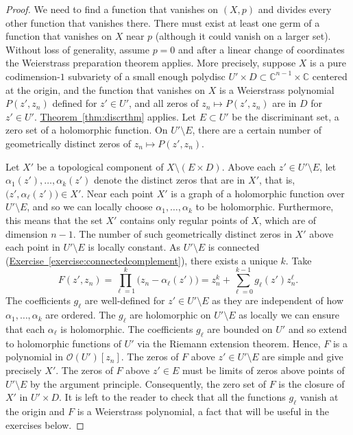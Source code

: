 \documentclass[12pt,openany]{book}
\newcommand{\C}{{\mathbb{C}}}
\newcommand{\sO}{{\mathscr{O}}}
\theoremstyle{plain}
\theoremstyle{remark}
\theoremstyle{definition}
\theoremstyle{exercise}
\theoremstyle{example}
\newcommand{\exerciseref}[1]{\hyperref[#1]{Exercise~\ref*{#1}}}
\newcommand{\thmref}[1]{\hyperref[#1]{Theorem~\ref*{#1}}}
\begin{document}
\begin{proof}
We need to find a function that vanishes on $(X,p)$
and divides every other function that vanishes there.
There must exist at least one germ of a function that vanishes
on $X$ near $p$
(although it could vanish on a larger set).
Without loss of generality, assume $p=0$
and after a linear change
of coordinates the Weierstrass preparation theorem applies.
More precisely,
suppose $X$ is a pure codimension-$1$ subvariety
of a small enough
polydisc
$U' \times D \subset \C^{n-1} \times \C$ centered at the origin,
and the function that vanishes on $X$ is a
Weierstrass polynomial $P(z',z_n)$ defined for $z' \in U'$, and
all zeros of $z_n \mapsto P(z',z_n)$ are in $D$ for $z' \in U'$.
\thmref{thm:discrthm} applies. Let
$E \subset U'$ be the discriminant set, a zero set of a
holomorphic function.
On $U' \setminus E$, there are a certain number of geometrically
distinct zeros of $z_n \mapsto P(z',z_n)$.

Let $X'$ be a topological component of
$X \setminus ( E \times D )$.
Above each $z' \in U' \setminus E$,
let $\alpha_1(z'),\ldots,\alpha_k(z')$
denote the distinct zeros that are in $X'$,
that is, $\bigl(z',\alpha_\ell(z')\bigr) \in X'$.
Near each point $X'$ is a graph of a holomorphic function over
$U' \setminus E$, and so we can locally choose 
$\alpha_1,\ldots,\alpha_k$ to be holomorphic.
Furthermore, this means that the set $X'$ contains only regular points of
$X$, which are of dimension $n-1$.
The number of
such geometrically distinct zeros in $X'$ above each point in
$U' \setminus E$ is locally constant.
As $U' \setminus E$ is connected
(\exerciseref{exercise:connectedcomplement}),
there exists a unique $k$.  Take
\begin{equation*}
F(z',z_n) = \prod_{\ell=1}^k \bigl( z_n-\alpha_\ell(z')\bigr)
=
z_n^k + \sum_{\ell=0}^{k-1} g_\ell(z') z_n^\ell .
\end{equation*}
The coefficients $g_\ell$ are well-defined for $z' \in U' \setminus E$
as they are independent of how $\alpha_1,\ldots,\alpha_k$ are ordered.
The $g_\ell$ are holomorphic on $U' \setminus E$
as locally we can ensure that each $\alpha_\ell$ is holomorphic.
The coefficients $g_\ell$ are bounded
on $U'$ and so extend to holomorphic functions of $U'$
via the Riemann extension theorem.
Hence, $F$ is a polynomial
in $\sO(U')[z_n]$.
The zeros of $F$
above $z' \in U' \setminus E$
are simple and give precisely $X'$.
The zeros of $F$ above $z' \in E$ must be
limits of zeros above points of $U' \setminus E$
by the argument principle.
Consequently,
the zero set of $F$ is the closure of $X'$ in $U' \times D$.
It is left to the reader to check that
all the functions $g_\ell$ vanish at the origin and $F$ is a Weierstrass
polynomial, a fact that will be useful in the exercises below.


\end{proof}
\end{document}
